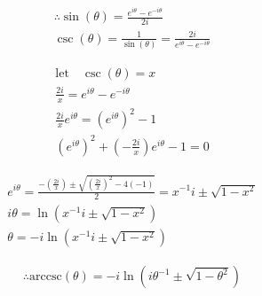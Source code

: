 \documentclass{../style}
\begin{document}
\euler

\begin{gather*}
	\therefore \sin(\theta) = \frac{e^{i\theta} - e^{-i\theta}}{2i} \\
	\csc(\theta) = \frac{1}{\sin(\theta)} = \frac{2i}{e^{i\theta} - e^{-i\theta}}
\end{gather*}

\begin{gather*}
	\text{let} \quad \csc(\theta) = x \\
	\frac{2i}{x} = e^{i\theta} - e^{-i\theta} \\
	\frac{2i}{x}e^{i\theta} = (e^{i\theta})^2 - 1 \\ 
	(e^{i\theta})^2 + (-\frac{2i}{x})e^{i\theta} - 1 = 0
\end{gather*}

\begin{gather*}
	e^{i\theta} = \frac{-(\frac{2i}{x}) \pm \sqrt{(\frac{2i}{x})^2 - 4(-1)}}{2} = x^{-1}i \pm \sqrt{1 - x^2} \\
	i\theta = \ln(x^{-1}i \pm \sqrt{1 - x^2}) \\
	\theta = -i\ln(x^{-1}i \pm \sqrt{1 - x^2})
\end{gather*}

\begin{gather*}
	\therefore \text{arccsc}(\theta) = -i\ln(i\theta^{-1} \pm \sqrt{1 -\theta^2})
\end{gather*}
\end{document}
